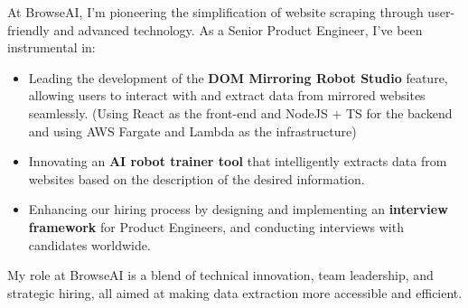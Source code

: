 \bigskip
{}
At BrowseAI, I'm pioneering the simplification of website scraping through user-friendly and advanced technology. As a Senior Product Engineer, I've been instrumental in:
\medskip
\begin{itemize}
    \item Leading the development of the \textbf{DOM Mirroring Robot Studio} feature, allowing users to interact with and extract data from mirrored websites seamlessly. (Using React as the front-end and NodeJS + TS for the backend and using AWS Fargate and Lambda as the infrastructure)
    \item Innovating an \textbf{AI robot trainer tool} that intelligently extracts data from websites based on the description of the desired information.
    \item Enhancing our hiring process by designing and implementing an \textbf{interview framework} for Product Engineers, and conducting interviews with candidates worldwide.
\end{itemize}
My role at BrowseAI is a blend of technical innovation, team leadership, and strategic hiring, all aimed at making data extraction more accessible and efficient.

\bigskip
\divider
\bigskip


